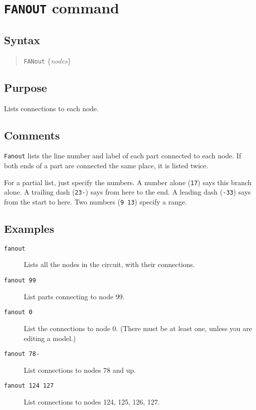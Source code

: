 \section{{\tt FANOUT} command}
\subsection{Syntax}
\begin{verse}
{\tt FANout} \{{\it nodes}\}
\end{verse}
\subsection{Purpose}

Lists connections to each node.
\subsection{Comments}

{\tt Fanout} lists the line number and label of each part connected to each
node.  If both ends of a part are connected the same place, it is listed
twice.

For a partial list, just specify the numbers.  A number alone ({\tt 17}) says
this branch alone.  A trailing dash ({\tt 23-}) says from here to the end.  A
leading dash ({\tt -33}) says from the start to here.  Two numbers ({\tt 9
13}) specify a range.
\subsection{Examples}

\begin{description}

\item[{\tt fanout}] Lists all the nodes in the circuit, with their
connections.

\item[{\tt fanout 99}] List parts connecting to node 99.

\item[{\tt fanout 0}] List the connections to node 0.  (There must be at
least one, unless you are editing a model.)

\item[{\tt fanout 78-}] List connections to nodes 78 and up.

\item[{\tt fanout 124 127}] List connections to nodes 124, 125, 126, 127.

\end{description}
